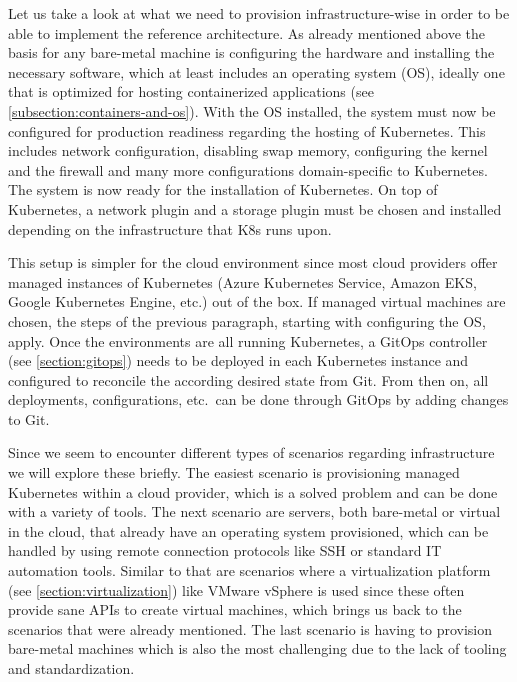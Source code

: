     Let us take a look at what we need to provision infrastructure-wise in order to be able to implement the reference architecture. As already mentioned above the basis for any bare-metal machine is configuring the hardware and installing the necessary software, which at least includes an operating system (OS), ideally one that is optimized for hosting containerized applications (see \autoref{subsection:containers-and-os}). With the OS installed, the system must now be configured for production readiness regarding the hosting of Kubernetes. This includes network configuration, disabling swap memory, configuring the kernel and the firewall and many more configurations domain-specific to Kubernetes. The system is now ready for the installation of Kubernetes. On top of Kubernetes, a network plugin and a storage plugin must be chosen and installed depending on the infrastructure that K8s runs upon.

    This setup is simpler for the cloud environment since most cloud providers offer managed instances of Kubernetes (Azure Kubernetes Service, Amazon EKS, Google Kubernetes Engine, etc.) out of the box. If managed virtual machines are chosen, the steps of the previous paragraph, starting with configuring the OS, apply. Once the environments are all running Kubernetes, a GitOps controller (see \autoref{section:gitops}) needs to be deployed in each Kubernetes instance and configured to reconcile the according desired state from Git. From then on, all deployments, configurations, etc.\ can be done through GitOps by adding changes to Git.\newline
    
    Since we seem to encounter different types of scenarios regarding infrastructure we will explore these briefly. The easiest scenario is provisioning managed Kubernetes within a cloud provider, which is a solved problem and can be done with a variety of tools. The next scenario are servers, both bare-metal or virtual in the cloud, that already have an operating system provisioned, which can be handled by using remote connection protocols like SSH or standard IT automation tools. Similar to that are scenarios where a virtualization platform (see \autoref{section:virtualization}) like VMware vSphere is used since these often provide sane APIs to create virtual machines, which brings us back to the scenarios that were already mentioned. The last scenario is having to provision bare-metal machines which is also the most challenging due to the lack of tooling and standardization. 

